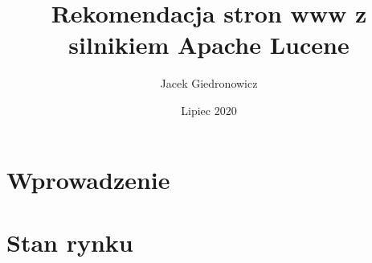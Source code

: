 \documentclass[licencjacka]{pracadypl}
\author{Jacek Giedronowicz}
\title{Rekomendacja stron www z silnikiem Apache Lucene }
\date{Lipiec 2020}
\theoremstyle{definition}
\newcommand{\linia}{\rule{\linewidth}{0.4mm}}
\begin{document}
\maketitle
\tableofcontents
\thispagestyle{empty}

\chapter{Wprowadzenie}

%	
%

\chapter{Stan rynku}
%
%
\end{document}
